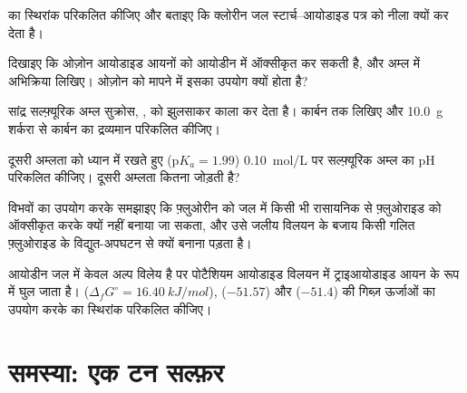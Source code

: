 \begin{exercise}[$\star\star$]\label{exo:b1:p-block-16-18:7}
 का स्थिरांक परिकलित कीजिए और बताइए कि क्लोरीन
जल स्टार्च--आयोडाइड पत्र को नीला क्यों कर देता है।
\end{exercise}

\begin{exercise}[$\star\star$]\label{exo:b1:p-block-16-18:8}
दिखाइए कि ओज़ोन आयोडाइड आयनों को आयोडीन में ऑक्सीकृत कर सकती है, और अम्ल में
अभिक्रिया लिखिए। ओज़ोन को मापने में इसका उपयोग क्यों होता है?
\end{exercise}

\begin{exercise}[$\star\star$]\label{exo:b1:p-block-16-18:9}
सांद्र सल्फ़्यूरिक अम्ल सुक्रोस, , को झुलसाकर काला कर देता है।
कार्बन तक  लिखिए और \qty{10.0}{g} शर्करा से कार्बन का द्रव्यमान
परिकलित कीजिए।
\end{exercise}

\begin{exercise}[$\star\star\star$]\label{exo:b1:p-block-16-18:10}
दूसरी अम्लता को ध्यान में रखते हुए ($\mathrm{p}K_a = 1.99$) \qty{0.10}{mol/L} पर
सल्फ़्यूरिक अम्ल का pH परिकलित कीजिए। दूसरी अम्लता
कितना जोड़ती है?
\end{exercise}

\begin{exercise}[$\star\star\star$]\label{exo:b1:p-block-16-18:11}
विभवों का उपयोग करके समझाइए कि फ़्लुओरीन को जल में किसी भी रासायनिक  से
फ़्लुओराइड को ऑक्सीकृत करके क्यों नहीं बनाया जा सकता, और उसे जलीय विलयन के बजाय
किसी गलित फ़्लुओराइड के विद्युत-अपघटन से क्यों बनाना पड़ता है।
\end{exercise}

\begin{exercise}[$\star\star\star$]\label{exo:b1:p-block-16-18:12}
आयोडीन जल में केवल अल्प विलेय है पर पोटैशियम आयोडाइड
विलयन में ट्राइआयोडाइड आयन  के रूप में घुल जाता है।
 ($\Delta_f G^\circ = \qty{16.40}{kJ/mol}$),  ($-51.57$)
और  ($-51.4$) की गिब्ज़ ऊर्जाओं का उपयोग करके  का स्थिरांक परिकलित कीजिए।
\end{exercise}

\section{समस्या: एक टन सल्फ़र}

